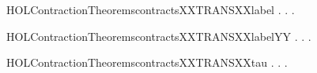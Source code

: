 \begin{SaveVerbatim}{HOLContractionTheoremscontractsXXTRANSXXlabel}
\HOLTokenTurnstile{} \HOLSymConst{\HOLTokenForall{}} .
          \HOLSymConst{\HOLTokenImp{}}
       \HOLSymConst{\HOLTokenForall{}} .
            \HOLTokenTransBegin{} \HOLTokenTransEnd {} \HOLSymConst{\HOLTokenImp{}}
           \HOLSymConst{\HOLTokenExists{}}.  \HOLTokenTransBegin{} \HOLTokenTransEnd {} \HOLSymConst{\HOLTokenConj{}}   
\end{SaveVerbatim}
\newcommand{\HOLContractionTheoremscontractsXXTRANSXXlabel}{\UseVerbatim{HOLContractionTheoremscontractsXXTRANSXXlabel}}
\begin{SaveVerbatim}{HOLContractionTheoremscontractsXXTRANSXXlabelYY}
\HOLTokenTurnstile{} \HOLSymConst{\HOLTokenForall{}} .
          \HOLSymConst{\HOLTokenImp{}}
       \HOLSymConst{\HOLTokenForall{}} .
            \HOLTokenTransBegin{} \HOLTokenTransEnd {} \HOLSymConst{\HOLTokenImp{}}
           \HOLSymConst{\HOLTokenExists{}}.  \HOLTokenWeakTransBegin{} \HOLTokenWeakTransEnd {} \HOLSymConst{\HOLTokenConj{}}   
\end{SaveVerbatim}
\newcommand{\HOLContractionTheoremscontractsXXTRANSXXlabelYY}{\UseVerbatim{HOLContractionTheoremscontractsXXTRANSXXlabelYY}}
\begin{SaveVerbatim}{HOLContractionTheoremscontractsXXTRANSXXtau}
\HOLTokenTurnstile{} \HOLSymConst{\HOLTokenForall{}} .
          \HOLSymConst{\HOLTokenImp{}}
       \HOLSymConst{\HOLTokenForall{}}.
            \HOLTokenTransBegin\HOLConst{\ensuremath{\tau}}\HOLTokenTransEnd {} \HOLSymConst{\HOLTokenImp{}}
              \HOLSymConst{\HOLTokenDisj{}} \HOLSymConst{\HOLTokenExists{}}.  \HOLTokenTransBegin\HOLConst{\ensuremath{\tau}}\HOLTokenTransEnd {} \HOLSymConst{\HOLTokenConj{}}   
\end{SaveVerbatim}
